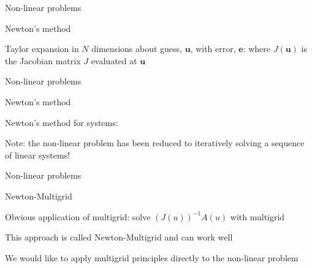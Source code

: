 \documentclass[18pt,xcolor=table]{beamer}
\begin{document}
\begin{frame}{Non-linear problems}
\begin{block}{Newton's method}
\bit
\item Taylor expansion in $N$ dimensions about guess, $\mathbf{u}$, with error, $\mathbf{e}$:
where $J(\mathbf{u})$ is the Jacobian matrix $J$ evaluated at $\mathbf{u}$
\eit
\end{block}
\end{frame}

\begin{frame}{Non-linear problems}
\begin{block}{Newton's method}
\bit
\item Newton's method for systems:
\item Note: the non-linear problem has been reduced to iteratively solving a sequence of linear systems!
\eit
\end{block}
\end{frame}

\begin{frame}{Non-linear problems}
\begin{block}{Newton-Multigrid}
\bit
\item Obvious application of multigrid: solve $(J(u))^{-1}A(u)$ with multigrid
\item This approach is called Newton-Multigrid and can work well
\item We would like to apply multigrid principles directly to the non-linear problem
\eit
\end{block}
\end{frame}
\end{document}
